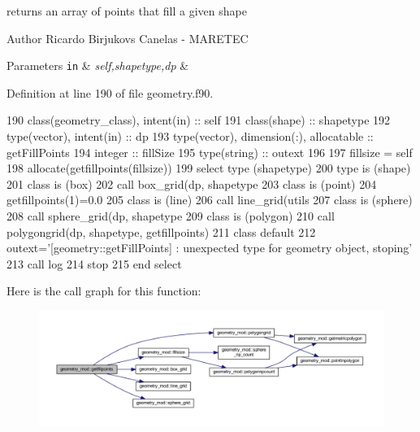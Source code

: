 returns an array of points that fill a given shape 

\begin{DoxyAuthor}{Author}
Ricardo Birjukovs Canelas -\/ M\+A\+R\+E\+T\+EC 
\end{DoxyAuthor}

\begin{DoxyParams}[1]{Parameters}
\mbox{\tt in}  & {\em self,shapetype,dp} & \\
\hline
\end{DoxyParams}


Definition at line 190 of file geometry.\+f90.


\begin{DoxyCode}
190     \textcolor{keywordtype}{class}(geometry\_class), \textcolor{keywordtype}{intent(in)} :: self
191     \textcolor{keywordtype}{class}(shape) :: shapetype
192     \textcolor{keywordtype}{type}(vector), \textcolor{keywordtype}{intent(in)} :: dp
193     \textcolor{keywordtype}{type}(vector), \textcolor{keywordtype}{dimension(:)}, \textcolor{keywordtype}{allocatable} :: getFillPoints
194     \textcolor{keywordtype}{integer} :: fillSize
195     \textcolor{keywordtype}{type}(string) :: outext
196 
197     fillsize = self%
198     \textcolor{keyword}{allocate}(getfillpoints(fillsize))
199     \textcolor{keywordflow}{select type} (shapetype)
200 \textcolor{keywordflow}{    type is} (shape)
201 \textcolor{keywordflow}{    class is} (box)
202         \textcolor{keyword}{call }box\_grid(dp, shapetype%
203 \textcolor{keywordflow}{    class is} (point)
204         getfillpoints(1)=0.0
205 \textcolor{keywordflow}{    class is} (line)
206         \textcolor{keyword}{call }line\_grid(utils%
207 \textcolor{keywordflow}{    class is} (sphere)
208         \textcolor{keyword}{call }sphere\_grid(dp, shapetype%
209 \textcolor{keywordflow}{    class is} (polygon)
210         \textcolor{keyword}{call }polygongrid(dp, shapetype, getfillpoints)
211 \textcolor{keywordflow}{        class default}
212         outext=\textcolor{stringliteral}{'[geometry::getFillPoints] : unexpected type for geometry object, stoping'}
213         \textcolor{keyword}{call }log%
214         stop
215 \textcolor{keywordflow}{    end select}
\end{DoxyCode}
Here is the call graph for this function\+:\nopagebreak
\begin{figure}[H]
\begin{center}
\leavevmode
\includegraphics[width=350pt]{namespacegeometry__mod_a12f7679eb15f32630680f2b8504827b3_cgraph}
\end{center}
\end{figure}

